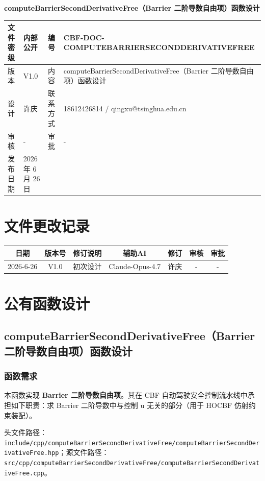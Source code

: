 \documentclass[a4paper,10pt]{article}
\begin{document}
\begin{titlepage}
    \centering
    {\Huge\textbf{computeBarrierSecondDerivativeFree（Barrier 二阶导数自由项）函数设计}\par}
    \vspace{1.5cm}
    \renewcommand{\arraystretch}{1.5}
    \begin{tabular}{|l|l|l|l|}
        \hline
        文件密级 & 内部公开 & 编号 & CBF-DOC-COMPUTEBARRIERSECONDDERIVATIVEFREE \\ \hline
        版本 & V1.0 & 内容 & computeBarrierSecondDerivativeFree（Barrier 二阶导数自由项）函数设计 \\ \hline
        设计 & 许庆 & 联系方式 & 18612426814 / qingxu@tsinghua.edu.cn \\ \hline
        审核 & - & 审批 & - \\ \hline
        发布日期 & 2026 年 6 月 26 日 & & \\ \hline
    \end{tabular}
    \vspace{1.5cm}
    \section*{文件更改记录}
    \begin{longtable}{|c|c|p{4cm}|c|c|c|c|}
        \hline
        日期 & 版本号 & 修订说明 & 辅助AI & 修订 & 审核 & 审批 \\ \hline
        2026-6-26 & V1.0 & 初次设计 & Claude-Opus-4.7 & 许庆 & - & - \\ \hline
    \end{longtable}
\end{titlepage}
\tableofcontents
\newpage
\section{公有函数设计}
\subsection{computeBarrierSecondDerivativeFree（Barrier 二阶导数自由项）函数设计}
\subsubsection{函数需求}
\par 本函数实现 \textbf{Barrier 二阶导数自由项}。其在 CBF 自动驾驶安全控制流水线中承担如下职责：求 Barrier 二阶导数中与控制 u 无关的部分（用于 HOCBF 仿射约束装配）。
\par 头文件路径：\texttt{include/cpp/computeBarrierSecondDerivativeFree/computeBarrierSecondDerivativeFree.hpp}；源文件路径：\texttt{src/cpp/computeBarrierSecondDerivativeFree/computeBarrierSecondDerivativeFree.cpp}。
\end{document}
